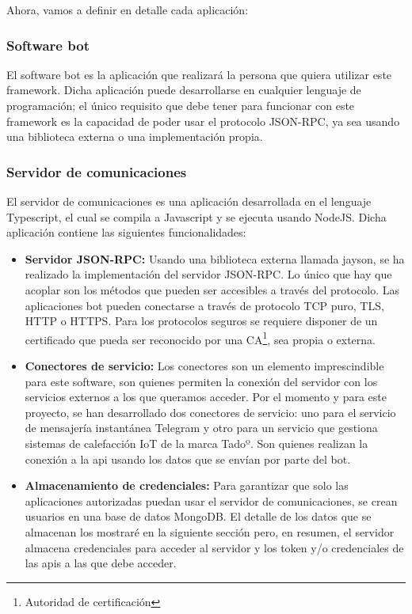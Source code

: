\documentclass[spanish,12pt, a4paper, twoside]{paper}
\begin{document}
Ahora, vamos a definir en detalle cada aplicación:

\subsubsection{Software bot}

El software bot es la aplicación que realizará la persona que quiera utilizar este framework. Dicha aplicación puede desarrollarse en cualquier lenguaje de programación; el único requisito que debe tener para funcionar con este framework es la capacidad de poder usar el protocolo JSON-RPC, ya sea usando una biblioteca externa o una implementación propia.

\subsubsection{Servidor de comunicaciones}

El servidor de comunicaciones es una aplicación desarrollada en el lenguaje Typescript, el cual se compila a Javascript y se ejecuta usando NodeJS. Dicha aplicación contiene las siguientes funcionalidades:

\begin{itemize}
\item \textbf{Servidor JSON-RPC:} Usando una biblioteca externa llamada jayson, se ha realizado la implementación del servidor JSON-RPC. Lo único que hay que acoplar son los métodos que pueden ser accesibles a través del protocolo. Las aplicaciones bot pueden conectarse a través de protocolo TCP puro, TLS, HTTP o HTTPS. Para los protocolos seguros se requiere disponer de un certificado que pueda ser reconocido por una CA\footnote{Autoridad de certificación}, sea propia o externa.

\item \textbf{Conectores de servicio:} Los conectores son un elemento imprescindible para este software, son quienes permiten la conexión del servidor con los servicios externos a los que queramos acceder. Por el momento y para este proyecto, se han desarrollado dos conectores de servicio: uno para el servicio de mensajería instantánea Telegram y otro para un servicio que gestiona sistemas de calefacción IoT de la marca Tadoº. Son quienes realizan la conexión a la api usando los datos que se envían por parte del bot.

\item \textbf{Almacenamiento de credenciales:} Para garantizar que solo las aplicaciones autorizadas puedan usar el servidor de comunicaciones, se crean usuarios en una base de datos MongoDB. El detalle de los datos que se almacenan los mostraré en la siguiente sección pero, en resumen, el servidor almacena credenciales para acceder al servidor y los token y/o credenciales de las apis a las que debe acceder.
\end{itemize}
\end{document}
